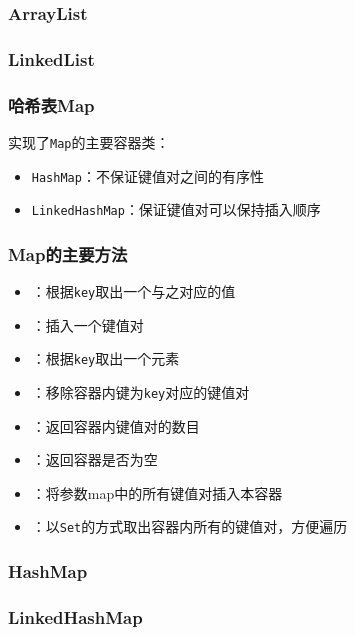 \begin{frame}
  \frametitle{ArrayList}
\end{frame}

\begin{frame}
  \frametitle{LinkedList}
\end{frame}

\begin{frame}
  \frametitle{哈希表Map}
  实现了\texttt{Map}的主要容器类：
  \begin{itemize}
    \item \texttt{HashMap}：不保证键值对之间的有序性
    \item \texttt{LinkedHashMap}：保证键值对可以保持插入顺序
  \end{itemize}
\end{frame}

\begin{frame}[fragile]
  \frametitle{Map的主要方法}
  \begin{itemize}
    \item {}：根据\texttt{key}取出一个与之对应的值
    \item {}：插入一个键值对
    \item {}：根据\texttt{key}取出一个元素
    \item {}：移除容器内键为\texttt{key}对应的键值对
    \item {}：返回容器内键值对的数目
    \item {}：返回容器是否为空
    \item {}：将参数map中的所有键值对插入本容器
    \item {}：以\texttt{Set}的方式取出容器内所有的键值对，方便遍历
  \end{itemize}
\end{frame}

\begin{frame}[fragile]
  \frametitle{HashMap}

\end{frame}

\begin{frame}[fragile]
  \frametitle{LinkedHashMap}

\end{frame}

